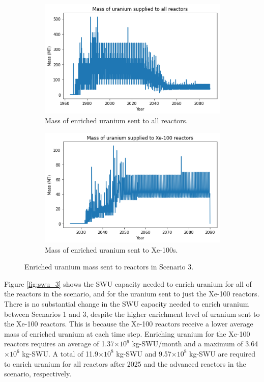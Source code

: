 \begin{figure}
    \centering
    \begin{subfigure}{0.5\textwidth}
        \centering
        \includegraphics[scale=0.5]{../figures/fuelsupply_scenarios_3.png}
        \caption{Mass of enriched uranium sent to all reactors.}
        \label{fig:totalfuel_3}
    \end{subfigure}
    \hspace{0.8cm}
    \begin{subfigure}{0.5\textwidth}
        \centering
        \includegraphics[scale=0.5]{../figures/advancedRX_fuelsupply_scenarios_3.png}
        \caption{Mass of enriched uranium sent to Xe-100s.}
        \label{fig:haleu_3}
    \end{subfigure}
    \caption{Enriched uranium mass sent to reactors in Scenario 3.}
    \label{fig:fuel_3}
\end{figure}

Figure \ref{fig:swu_3} shows the \gls{SWU} capacity needed to enrich 
uranium for all of the reactors in the scenario, and for the uranium sent 
to just the Xe-100 reactors. There is no substantial change in the 
\gls{SWU} capacity needed to enrich uranium between Scenarios 1 and 3, 
despite the higher enrichment level of uranium 
sent to the Xe-100 reactors. This is because the Xe-100 reactors receive 
a lower average mass of enriched uranium at each time step. Enriching uranium 
for the Xe-100 reactors requires an average of 
1.37$\times 10^6$ kg-\gls{SWU}/month and a maximum of 3.64$\times 10^6$
kg-\gls{SWU}. A total of 11.9$\times 10^8$ kg-SWU and 9.57$\times 10^8$
kg-SWU are required 
to enrich uranium for all reactors after 2025 and the advanced reactors in the 
scenario, respectively. 


